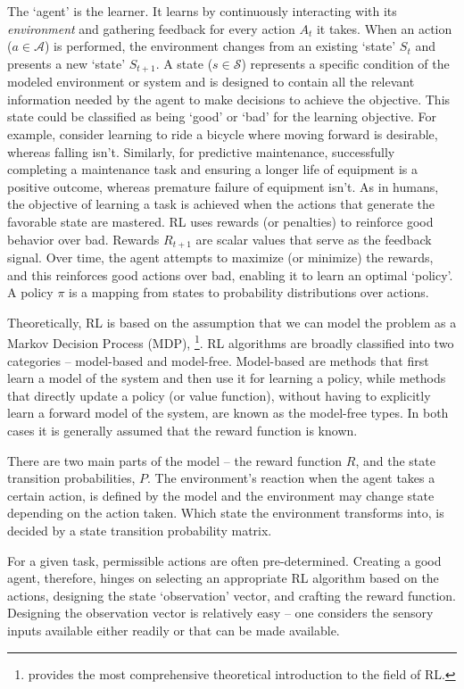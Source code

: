 \documentclass{article}
\begin{document}
	The `agent' is the learner. It learns by continuously interacting with its \textit{environment} and gathering feedback for every action $A_t$ it takes. When an action ($a\in \mathcal{A}$) is performed, the environment changes from an existing `state' $S_t$ and presents a new `state' $S_{t+1}$. A state ($s\in \mathcal{S}$) represents a specific condition of the modeled environment or system and is designed to contain all the relevant information needed by the agent to make decisions to achieve the objective. This state could be classified as being `good' or `bad' for the learning objective. For example, consider learning to ride a bicycle where moving forward is desirable, whereas falling isn't. Similarly, for predictive maintenance, successfully completing a maintenance task and ensuring a longer life of equipment is a positive outcome, whereas premature failure of equipment isn't. As in humans, the objective of learning a task is achieved when the actions that generate the favorable state are mastered. RL uses rewards (or penalties) to reinforce good behavior over bad. Rewards $R_{t+1}$ are scalar values that serve as the feedback signal. Over time, the agent attempts to maximize (or minimize) the rewards, and this reinforces good actions over bad, enabling it to learn an optimal `policy'. A policy $\pi$ is a mapping from states to probability distributions over actions.
	
	Theoretically, RL is based on the assumption that we can model the problem as a Markov Decision Process (MDP), \citep{sutton2018}\footnote{\citet{sutton2018} provides the most comprehensive theoretical introduction to the field of RL.}. 
	RL algorithms are broadly classified into two categories -- model-based and model-free. Model-based are methods that first learn a model of the system and then use it for learning a policy, while methods that directly update a policy (or value function), without having to explicitly learn a forward model of the system, are known as the model-free types. In both cases it is generally assumed that the reward function is known.
	
	There are two main parts of the model -- the reward function $R$, and the state transition probabilities, $P$. The environment's reaction when the agent takes a certain action, is defined by the model and the environment may change state depending on the action taken. Which state the environment transforms into, is decided by a state transition probability matrix. 
	
	For a given task, permissible actions are often pre-determined. Creating a good agent, therefore, hinges on selecting an appropriate RL algorithm based on the actions, designing the state `observation' vector, and crafting the reward function. Designing the observation vector is relatively easy -- one considers the sensory inputs available either readily or that can be made available. 
	
\end{document}
